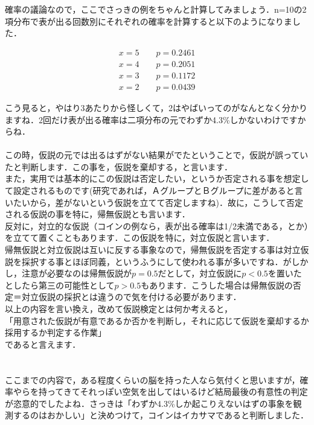 \documentclass[11pt,a4paper,uplatex]{ujreport} 	%
\begin{document}
確率の議論なので，ここでさっきの例をちゃんと計算してみましょう．n=10の2項分布で表が出る回数別にそれぞれの確率を計算すると以下のようになりました．

\begin{align}
  x=5 \qquad p = 0.2461 \nonumber \\
  x=4 \qquad p = 0.2051 \nonumber \\
  x=3 \qquad p = 0.1172 \nonumber\\
  x=2 \qquad p = 0.0439 \nonumber
\end{align}

こう見ると，やはり3あたりから怪しくて，2はやばいってのがなんとなく分かりますね．2回だけ表が出る確率は二項分布の元でわずか4.3\%しかないわけですからね．\\
\\

この時，仮説の元では出るはずがない結果がでたということで，仮説が誤っていたと判断します．この事を，仮説を棄却する，と言います．\\

また，実用では基本的にこの仮説は否定したい，というか否定される事を想定して設定されるものです(研究であれば，ＡグループとＢグループに差があると言いたいから，差がないという仮説を立てて否定しますね)．故に，こうして否定される仮説の事を特に，帰無仮説とも言います．\\

反対に，対立的な仮説（コインの例なら，表が出る確率は1/2未満である，とか）を立てて置くこともあります．この仮説を特に，対立仮説と言います．\\

帰無仮説と対立仮説は互いに反する事象なので，帰無仮説を否定する事は対立仮説を採択する事とほぼ同義，というふうにして使われる事が多いですね．がしかし，注意が必要なのは帰無仮説が$p=0.5$だとして，対立仮説に$p<0.5$を置いたとしたら第三の可能性として$p>0.5$もあります．こうした場合は帰無仮説の否定＝対立仮説の採択とは違うので気を付ける必要があります．\\


以上の内容を言い換え，改めて仮説検定とは何か考えると，\\
「用意された仮説が有意であるか否かを判断し，それに応じて仮説を棄却するか採用するか判定する作業」\\
であると言えます．\\
\\
\\

ここまでの内容で，ある程度くらいの脳を持った人なら気付くと思いますが，確率やらを持ってきてそれっぽい空気を出してはいるけど結局最後の有意性の判定が恣意的でしたよね．さっきは「わずか4.3\%しか起こりえないはずの事象を観測するのはおかしい」と決めつけて，コインはイカサマであると判断しました．\\
\end{document}
